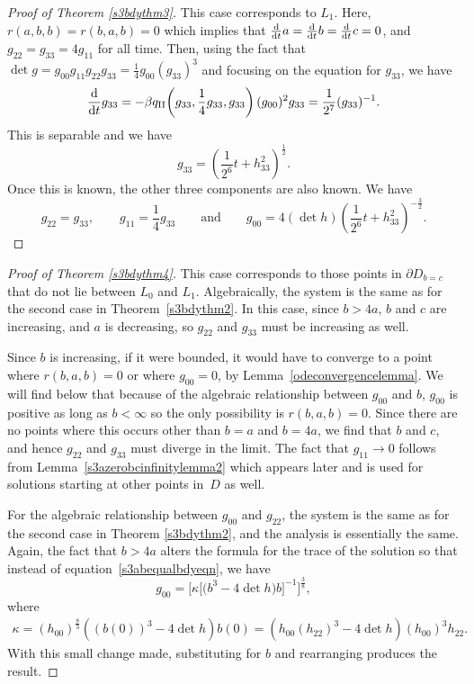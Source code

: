 \documentclass[pdftex]{sigma}
\numberwithin{equation}{section}
\newcommand{\dtime}{\frac{{\rm d}}{{\rm d} t}} %
\begin{document}
\begin{proof}[Proof of Theorem \ref{s3bdythm3}]
This case corresponds to $L_1$. Here, $r(a, b, b) = r(b, a, b) = 0$ which implies that $\dtime a = \dtime b = \dtime c = 0$, and $g_{22} = g_{33} = 4g_{11}$ for all time. Then, using the fact that $\det g = g_{00} g_{11} g_{22} g_{33} = \frac{1}{4} g_{00} (g_{33})^3$ and focusing on the equation for $g_{33}$, we have
\begin{equation*}
\dtime g_{33} = -\beta q_{\rm II}\! \left(g_{33}, \frac{1}{4} g_{33}, g_{33} \right) (g_{00})^2 g_{33}
		= \frac{1}{2^7} (g_{33})^{-1}.
\end{equation*}
This is separable and we have
\[
g_{33} = \left(\frac{1}{2^6} t + h_{33}^2 \right)^{\frac{1}{2}}.
\]
Once this is known, the other three components are also known. We have
\begin{equation*}
g_{22} = g_{33},\qquad g_{11} = \frac{1}{4} g_{33}
\qquad \text{and}\qquad
g_{00} = 4 (\det h) \left(\frac{1}{2^6} t + h_{33}^2\right)^{-\frac{3}{2}}.\tag*{\qed}
\end{equation*}
 \renewcommand{\qed}{}
\end{proof}

\begin{proof}[Proof of Theorem \ref{s3bdythm4}]
This case corresponds to those points in $\partial D_{b = c}$ that do not lie between $L_0$ and $L_1$. Algebraically, the system is the same as for the second case in Theorem~\ref{s3bdythm2}. In this case, since $b > 4a$, $b$ and $c$ are increasing, and $a$ is decreasing, so $g_{22}$ and $g_{33}$ must be increasing as well.

Since $b$ is increasing, if it were bounded, it would have to converge to a point where \mbox{$r(b, a, b)\! =\! 0$} or where $g_{00} = 0$, by Lemma~\ref{odeconvergencelemma}. We will find below that because of the algebraic relationship between $g_{00}$ and $b$, $g_{00}$ is positive as long as $b < \infty$ so the only possibility is $r(b, a, b) = 0$. Since there are no points where this occurs other than $b = a$ and $b = 4a$, we find that $b$ and $c$, and hence $g_{22}$ and $g_{33}$ must diverge in the limit. The fact that $g_{11} \rightarrow 0$ follows from Lemma~\ref{s3azerobcinfinitylemma2} which appears later and is used for solutions starting at other points in~$D$ as well.

For the algebraic relationship between $g_{00}$ and $g_{22}$, the system is the same as for the second case in Theorem \ref{s3bdythm2}, and the analysis is essentially the same. Again, the fact that $b > 4a$ alters the formula for the trace of the solution so that instead of equation~\eqref{s3abequalbdyeqn}, we have
\begin{equation*} \label{s3bcequalbdyeqn}
g_{00} = \bigl[\kappa \bigl[\big(b^3 - 4 \det h\big) b \bigr]^{-1} \bigr]^{\frac{3}{8}},
\end{equation*}
where
\begin{gather*}
\kappa = (h_{00})^{\frac{8}{3}} ((b(0))^3 - 4 \det h) b(0)
	= (h_{00} (h_{22})^3 - 4 \det h) (h_{00})^3 h_{22}.
\end{gather*}
With this small change made, substituting for $b$ and rearranging produces the result.
\end{proof}
\end{document}

